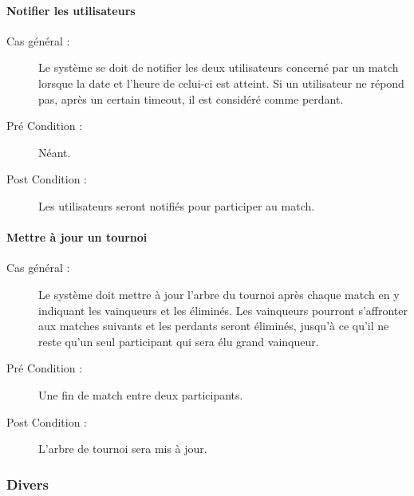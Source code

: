 \documentclass[a4paper]{article}
\begin{document}
\paragraph{Notifier les \glspl{utilisateur}}
\begin{description}
\item[Cas général :] Le système se doit de notifier les deux \glspl{utilisateur} concerné par un match lorsque la date et l'heure de celui-ci est atteint. Si un \gls{utilisateur} ne répond pas, après un certain timeout, il est considéré comme perdant.
\item[Pré Condition  :] Néant.
\item[Post Condition :] Les \glspl{utilisateur} seront notifiés pour participer au match.
\end{description}

\paragraph{Mettre à jour un tournoi}
\begin{description}
\item[Cas général :] Le système doit mettre à jour l'arbre du tournoi après chaque match en y indiquant les vainqueurs et les éliminés. Les vainqueurs pourront s'affronter aux matches suivants et les perdants seront éliminés, jusqu'à ce qu'il ne reste qu'un seul participant qui sera élu grand vainqueur.
\item[Pré Condition  :] Une fin de match entre deux participants.
\item[Post Condition :] L'arbre de tournoi sera mis à jour.
\end{description}

\subsubsection{Divers}
\end{document}

